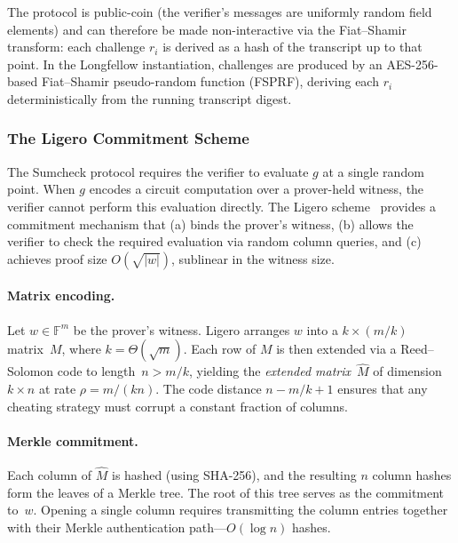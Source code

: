 \noindent
The protocol is public-coin (the verifier's messages are uniformly random
field elements) and can therefore be made non-interactive via the Fiat--Shamir
transform: each challenge $r_i$ is derived as a hash of the transcript up to
that point.  In the Longfellow instantiation, challenges are produced by an
AES-256-based Fiat--Shamir pseudo-random function (FSPRF), deriving each
$r_i$ deterministically from the running transcript digest.

\subsubsection{The Ligero Commitment Scheme}\label{sec:bg-ligero}

The Sumcheck protocol requires the verifier to evaluate $g$ at a single random
point.  When $g$ encodes a circuit computation over a prover-held witness, the
verifier cannot perform this evaluation directly.  The Ligero
scheme~\cite{ligero} provides a commitment mechanism that (a) binds the
prover's witness, (b) allows the verifier to check the required evaluation via
random column queries, and (c) achieves proof size $O(\sqrt{\lvert w \rvert})$,
sublinear in the witness size.

\paragraph{Matrix encoding.}
Let $w \in \mathbb{F}^m$ be the prover's witness.  Ligero arranges $w$ into a
$k \times (m/k)$ matrix~$M$, where $k = \Theta(\sqrt{m})$.  Each row of $M$ is
then extended via a Reed--Solomon code to length~$n > m/k$, yielding the
\emph{extended matrix}~$\hat{M}$ of dimension~$k \times n$ at rate
$\rho = m/(kn)$.  The code distance $n - m/k + 1$ ensures that any cheating
strategy must corrupt a constant fraction of columns.

\paragraph{Merkle commitment.}
Each column of $\hat{M}$ is hashed (using SHA-256), and the resulting $n$
column hashes form the leaves of a Merkle tree.  The root of this tree serves
as the commitment to~$w$.  Opening a single column requires transmitting the
column entries together with their Merkle authentication path---$O(\log n)$
hashes.

